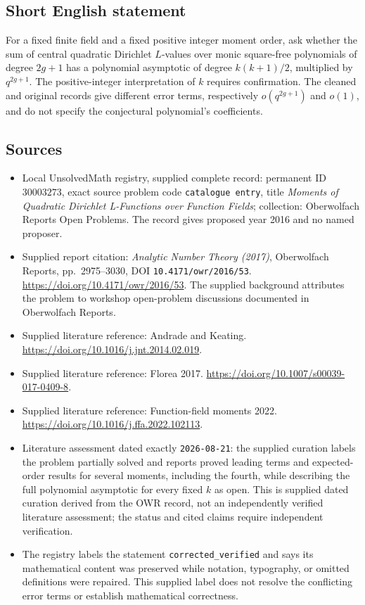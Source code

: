 \documentclass[11pt]{article}
\begin{document}
\subsection{Short English statement}
For a fixed finite field and a fixed positive integer moment order, ask whether the sum of central quadratic Dirichlet \(L\)-values over monic square-free polynomials of degree \(2g+1\) has a polynomial asymptotic of degree \(k(k+1)/2\), multiplied by \(q^{2g+1}\). The positive-integer interpretation of \(k\) requires confirmation. The cleaned and original records give different error terms, respectively \(o(q^{2g+1})\) and \(o(1)\), and do not specify the conjectural polynomial's coefficients.
\subsection{Sources}
\begin{itemize}
\item Local UnsolvedMath registry, supplied complete record: permanent ID \(30003273\), exact source problem code \texttt{catalogue entry}, title \emph{Moments of Quadratic Dirichlet L-Functions over Function Fields}; collection: Oberwolfach Reports Open Problems. The record gives proposed year 2016 and no named proposer.
\item Supplied report citation: \emph{Analytic Number Theory (2017)}, Oberwolfach Reports, pp.\ 2975--3030, DOI \texttt{10.4171/owr/2016/53}. \url{https://doi.org/10.4171/owr/2016/53}. The supplied background attributes the problem to workshop open-problem discussions documented in Oberwolfach Reports.
\item Supplied literature reference: Andrade and Keating. \url{https://doi.org/10.1016/j.jnt.2014.02.019}.
\item Supplied literature reference: Florea 2017. \url{https://doi.org/10.1007/s00039-017-0409-8}.
\item Supplied literature reference: Function-field moments 2022. \url{https://doi.org/10.1016/j.ffa.2022.102113}.
\item Literature assessment dated exactly \texttt{2026-08-21}: the supplied curation labels the problem partially solved and reports proved leading terms and expected-order results for several moments, including the fourth, while describing the full polynomial asymptotic for every fixed \(k\) as open. This is supplied dated curation derived from the OWR record, not an independently verified literature assessment; the status and cited claims require independent verification.
\item The registry labels the statement \texttt{corrected\_verified} and says its mathematical content was preserved while notation, typography, or omitted definitions were repaired. This supplied label does not resolve the conflicting error terms or establish mathematical correctness.
\end{itemize}
\end{document}
